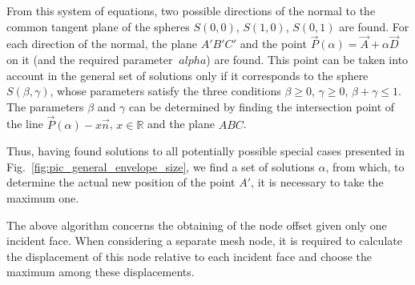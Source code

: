 \documentclass[
11pt,%
tightenlines,%
twoside,%
onecolumn,%
nofloats,%
nobibnotes,%
nofootinbib,%
superscriptaddress,%
noshowpacs,%
centertags]%
{revtex4-2}
\begin{document}
From this system of equations, two possible directions of the normal to the common tangent plane of the spheres $S(0,0)$, $S(1,0)$, $S(0, 1)$ are found.
For each direction of the normal, the plane $A'B'C'$ and the point $\vec{P}(\alpha) = \vec{A} + \alpha \vec{D}$ on it (and the required parameter $\ alpha$) are found.
This point can be taken into account in the general set of solutions only if it corresponds to the sphere $S(\beta, \gamma)$, whose parameters satisfy the three conditions $\beta \ge 0$, $\gamma \ge 0$, $ \beta + \gamma \le 1$.
The parameters $\beta$ and $\gamma$ can be determined by finding the intersection point of the line $\vec{P}(\alpha) - x \vec{n}$, $x \in \mathbb{R}$ and the plane $ABC$.

Thus, having found solutions to all potentially possible special cases presented in Fig.~\ref{fig:pic_general_envelope_size}, we find a set of solutions $\alpha$, from which, to determine the actual new position of the point $A'$, it is necessary to take the maximum one.

The above algorithm concerns the obtaining of the node offset given only one incident face.
When considering a separate mesh node, it is required to calculate the displacement of this node relative to each incident face and choose the maximum among these displacements.
\end{document}
